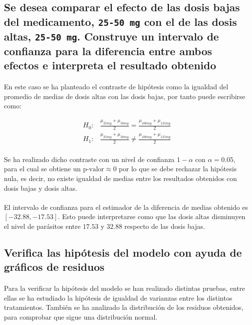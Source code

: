 \documentclass{article}
\begin{document}
    \subsection{Se desea comparar el efecto de las dosis bajas del medicamento, \texttt{25-50 mg} con el de las dosis altas, \texttt{25-50 mg}. Construye un intervalo de confianza para la diferencia entre ambos efectos e interpreta el resultado obtenido}

      \paragraph{}
      En este caso se ha planteado el contraste de hipótesis como la igualdad del promedio de medias de dosis altas con las dosis bajas, por tanto puede escribirse como:

      \begin{align}
        H_0:& \frac{\mu_{25mg} + \mu_{50mg}}{2} = \frac{\mu_{100mg} +\mu_{125mg}}{2} \\
        H_1:& \frac{\mu_{25mg} + \mu_{50mg}}{2} \neq \frac{\mu_{100mg} +\mu_{125mg}}{2}
      \end{align}

      \paragraph{}
      Se ha realizado dicho contraste con un nivel de confianza $1-\alpha$ con $\alpha = 0.05 $, para el cual se obtiene un $\text{p-valor}\approx 0$ por lo que se debe rechazar la hipótesis nula, es decir, no existe igualdad de medias entre los resultados obtenidos con dosis bajas y dosis altas.

      \paragraph{}
      El intervalo de confianza para el estimador de la diferencia de medias obtenido es $[-32.88, -17.53]$. Esto puede interpretarse como que las dosis altas disminuyen el nivel de parásitos entre $17.53$ y $32.88$ respecto de las dosis bajas.

    \subsection{Verifica las hipótesis del modelo con ayuda de gráficos de residuos}

      \paragraph{}
      Para la verificar la hipótesis del modelo se han realizado distintas pruebas, entre ellas se ha estudiado la hipótesis de igualdad de varianzas entre los distintos tratamientos. También se ha analizado la distribución de los residuos obtenidos, para comprobar que sigue una distribución normal.
\end{document}
